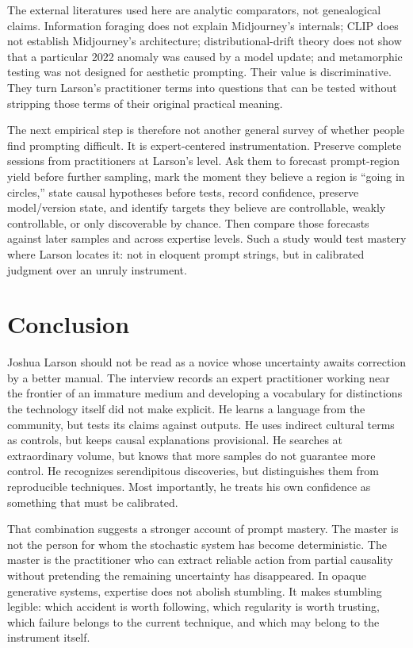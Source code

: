 \documentclass[11pt]{article}
\begin{document}
The external literatures used here are analytic comparators, not genealogical claims. Information foraging does not explain Midjourney's internals; CLIP does not establish Midjourney's architecture; distributional-drift theory does not show that a particular 2022 anomaly was caused by a model update; and metamorphic testing was not designed for aesthetic prompting. Their value is discriminative. They turn Larson's practitioner terms into questions that can be tested without stripping those terms of their original practical meaning.

The next empirical step is therefore not another general survey of whether people find prompting difficult. It is expert-centered instrumentation. Preserve complete sessions from practitioners at Larson's level. Ask them to forecast prompt-region yield before further sampling, mark the moment they believe a region is ``going in circles,'' state causal hypotheses before tests, record confidence, preserve model/version state, and identify targets they believe are controllable, weakly controllable, or only discoverable by chance. Then compare those forecasts against later samples and across expertise levels. Such a study would test mastery where Larson locates it: not in eloquent prompt strings, but in calibrated judgment over an unruly instrument.

\section{Conclusion}
Joshua Larson should not be read as a novice whose uncertainty awaits correction by a better manual. The interview records an expert practitioner working near the frontier of an immature medium and developing a vocabulary for distinctions the technology itself did not make explicit. He learns a language from the community, but tests its claims against outputs. He uses indirect cultural terms as controls, but keeps causal explanations provisional. He searches at extraordinary volume, but knows that more samples do not guarantee more control. He recognizes serendipitous discoveries, but distinguishes them from reproducible techniques. Most importantly, he treats his own confidence as something that must be calibrated.

That combination suggests a stronger account of prompt mastery. The master is not the person for whom the stochastic system has become deterministic. The master is the practitioner who can extract reliable action from partial causality without pretending the remaining uncertainty has disappeared. In opaque generative systems, expertise does not abolish stumbling. It makes stumbling legible: which accident is worth following, which regularity is worth trusting, which failure belongs to the current technique, and which may belong to the instrument itself.
\end{document}
